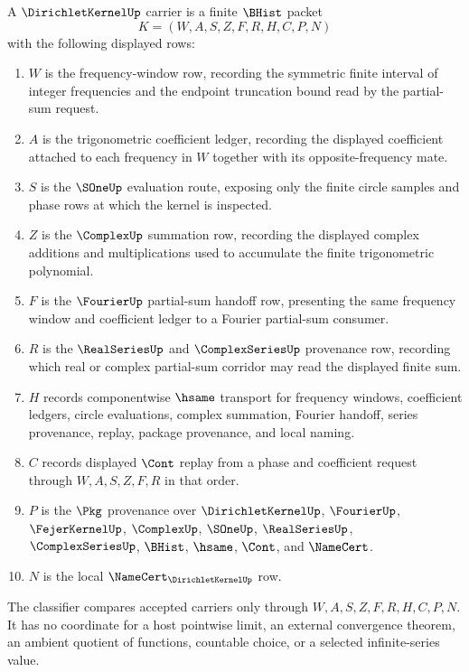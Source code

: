 \begin{definition}\label{def:dirichlet-kernel-carrier}
A $\DirichletKernelUp$ carrier is a finite $\BHist$ packet
$$
K=(W,A,S,Z,F,R,H,C,P,N)
$$
with the following displayed rows:
\begin{enumerate}
\item $W$ is the frequency-window row, recording the symmetric finite interval of integer frequencies and the endpoint truncation bound read by the partial-sum request.
\item $A$ is the trigonometric coefficient ledger, recording the displayed coefficient attached to each frequency in $W$ together with its opposite-frequency mate.
\item $S$ is the $\SOneUp$ evaluation route, exposing only the finite circle samples and phase rows at which the kernel is inspected.
\item $Z$ is the $\ComplexUp$ summation row, recording the displayed complex additions and multiplications used to accumulate the finite trigonometric polynomial.
\item $F$ is the $\FourierUp$ partial-sum handoff row, presenting the same frequency window and coefficient ledger to a Fourier partial-sum consumer.
\item $R$ is the $\RealSeriesUp$ and $\ComplexSeriesUp$ provenance row, recording which real or complex partial-sum corridor may read the displayed finite sum.
\item $H$ records componentwise $\hsame$ transport for frequency windows, coefficient ledgers, circle evaluations, complex summation, Fourier handoff, series provenance, replay, package provenance, and local naming.
\item $C$ records displayed $\Cont$ replay from a phase and coefficient request through $W,A,S,Z,F,R$ in that order.
\item $P$ is the $\Pkg$ provenance over $\DirichletKernelUp$, $\FourierUp$, $\FejerKernelUp$, $\ComplexUp$, $\SOneUp$, $\RealSeriesUp$, $\ComplexSeriesUp$, $\BHist$, $\hsame$, $\Cont$, and $\NameCert$.
\item $N$ is the local $\NameCert_{\DirichletKernelUp}$ row.
\end{enumerate}
The classifier compares accepted carriers only through $W,A,S,Z,F,R,H,C,P,N$. It has no coordinate for a host pointwise limit, an external convergence theorem, an ambient quotient of functions, countable choice, or a selected infinite-series value.
\end{definition}

